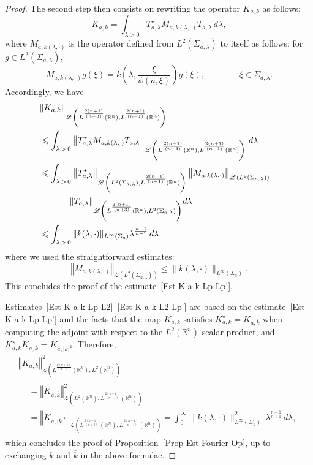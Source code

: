 \documentclass[AHL,Unicode,longabstracts]{cedram}
\newcommand{\scL}{\mathscr{L}}
\newcommand*\R{\mathbb{R}}
\newcommand{\norm}[1]{\left\Vert#1\right\Vert}
\renewcommand{\leq}{\leqslant}
\begin{document}
\begin{proof}
The second step then consists on rewriting the operator $K_{a,k}$ as follows:
\[
K_{a,k} = \int_{\lambda >0} T_{a,\lambda}^\star M_{a,k(\lambda, \cdot)} T_{a, \lambda} \, d\lambda,
\]
where $M_{a, k(\lambda, \cdot)}$ is the operator defined from $ L^2(\Sigma_{a, \lambda})$ to itself as follows: for $g \in L^2(\Sigma_{a,\lambda})$,
\[
M_{a, k(\lambda, \cdot)} g (\xi) = k\left(\lambda, \frac{\xi}{\psi(a, \xi)} \right) g(\xi), \qquad \qquad \xi \in \Sigma_{a,\lambda}.
\]
Accordingly, we have
\begingroup
\allowdisplaybreaks
\begin{align*}
\lefteqn{\norm{K_{a,k} }_{\scL\left(L^{\frac{2(n+1)}{(n+3)}}(\R^n),L^{\frac{2(n+1)}{(n-1)}}(\R^n)\right)} }
\\
& \leq
\int_{\lambda\, >\,0}
\norm{T_{a,\lambda}^\star M_{a,k(\lambda, \cdot)} T_{a, \lambda} }_{\scL\left(L^{\frac{2(n+1)}{(n+3)}}(\R^n),L^{\frac{2(n+1)}{(n-1)}}(\R^n)\right)}
\, d\lambda
\\
&\leq \int_{\lambda\, >\,0}
\norm{T_{a,\lambda}^\star}_{\scL\left(L^{2}(\Sigma_{a,\lambda}),L^{\frac{2(n+1)}{(n-1)}}(\R^n)\right)}
\norm{M_{a,k(\lambda, \cdot)} }_{\scL\left(L^{2}(\Sigma_{a,\lambda})\right)}\\
&\mkern60mu
\norm{T_{a, \lambda} }_{\scL\left(L^{\frac{2(n+1)}{(n+3)}}(\R^n),L^{2}(\Sigma_{a,\lambda})\right)}
\! d\lambda
\\
& \leq \int_{\lambda\,>\,0} \| k (\lambda, \cdot)\|_{L^\infty(\Sigma_a)} \lambda^{\frac{n-1}{n+1}} \, d\lambda,
\end{align*}
\endgroup
where we used the straightforward estimates:
\[
\norm{M_{a,k(\lambda, \cdot)} }_{\scL\left(L^{2}(\Sigma_{a,\lambda})\right)}
\leq
\| k(\lambda, \cdot) \|_{L^\infty(\Sigma_a)}.
\]
This concludes the proof of the estimate~\eqref{Est-K-a-k-Lp-Lp'}.

Estimates~\eqref{Est-K-a-k-Lp-L2}--\eqref{Est-K-a-k-L2-Lp'} are based on the estimate~\eqref{Est-K-a-k-Lp-Lp'} and the facts that the map $K_{a,k}$ satisfies $K_{a,k}^\star = K_{a,\overline{k}}$ when computing the adjoint with respect to the $L^2(\R^n)$ scalar product, and $K_{a,k}^\star K_{a,\overline k} = K_{a,|k|^2}$. Therefore,
\begin{multline*}
\norm{K_{a,k} }_{\scL\left(L^{\frac{2(n+1)}{(n+3)}}(\R^n),L^{2}(\R^n)\right)}^2\\
\begin{aligned}
&=
\norm{K_{a,\overline k} }_{\scL\left(L^{2}(\R^n),L^{\frac{2(n+1)}{(n-1)}}(\R^n)\right)}^2
\\
&=
\norm{K_{a,|k|^2} }_{\scL\left(L^{\frac{2(n+1)}{(n+3)}}(\R^n),L^{\frac{2(n+1)}{(n-1)}}(\R^n)\right)} =
\int_0^\infty \| k(\lambda, \cdot)\|_{L^\infty(\Sigma_a)}^2 \, \lambda^{\frac{n-1}{n+1}} \, d\lambda,
\end{aligned}
\end{multline*}
which concludes the proof of Proposition~\ref{Prop-Est-Fourier-Op}, up to exchanging $k$ and $\overline k$ in the above formulae.
\end{proof}
\end{document}
